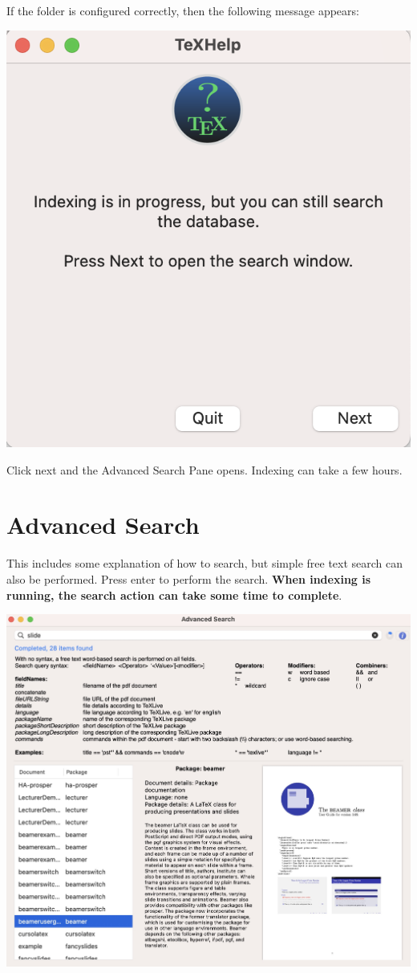 \documentclass[11pt,a4paper]{article}
\begin{document}
If the folder is configured correctly, then the following message appears:

\includegraphics[scale=0.5]{Indexing.png}

Click next and the Advanced Search Pane opens. Indexing can take a few hours.

\section{Advanced Search}

This includes some explanation of how to search, but simple free text search can also be performed. Press enter to perform the search. \textbf{When indexing is running, the search action can take some time to complete}.

\includegraphics[scale=0.25]{AdvancedSearch.jpg}
\end{document}
